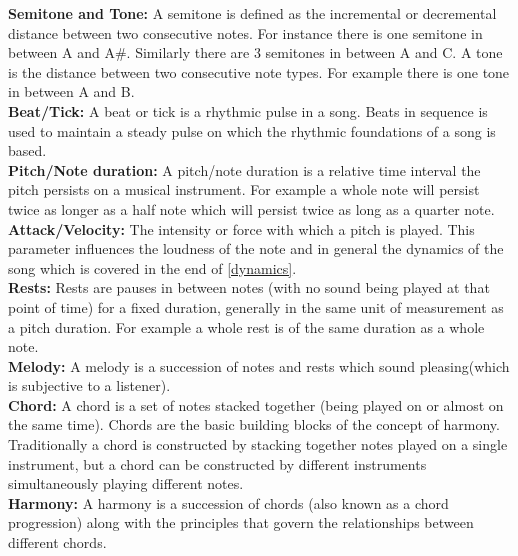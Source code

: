 \noindent \textbf{Semitone and Tone:} A semitone is defined as the incremental or decremental distance between two consecutive notes. For instance there is one semitone in between A and A\#. Similarly there are 3 semitones in between A and C. A tone is the distance between two consecutive note types. For example there is one tone in between A and B. \\

\noindent \textbf{Beat/Tick:} A beat or tick is a rhythmic pulse in a song. Beats in sequence is used to maintain a steady pulse on which the rhythmic foundations of a song is based.  \\

\noindent \textbf{Pitch/Note duration:} A pitch/note duration is a relative time interval the pitch persists on a musical instrument. For example a whole note will persist twice as longer as a half note which will persist twice as long as a quarter note.  \\

\noindent \textbf{Attack/Velocity:} The intensity or force with which a pitch is played. This parameter influences the loudness of the note and in general the dynamics of the song which is covered in the end of \ref{dynamics}. \\

\noindent \textbf{Rests:} Rests are pauses in between notes (with no sound being played at that point of time) for a fixed duration, generally in the same unit of measurement as a pitch duration. For example a whole rest is of the same duration as a whole note.  \\

\noindent \textbf{Melody:} A melody is a succession of notes and rests which sound pleasing(which is subjective to a listener). \\

\noindent \textbf{Chord:} A chord is a set of notes stacked together (being played on or almost on the same time). Chords are the basic building blocks of the concept of harmony. Traditionally a chord is constructed by stacking together notes played on a single instrument, but a chord can be constructed by different instruments simultaneously playing different notes. \\

\noindent \textbf{Harmony:} A harmony is a succession of chords (also known as a chord progression) along with the principles that govern the relationships between different chords. \\


